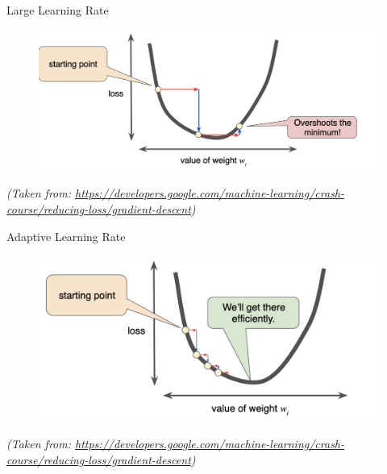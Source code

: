 \begin{frame}{Large Learning Rate}
         \begin{figure}
        \centering
          \includegraphics[scale=0.4]{./figures/large_lr.png}
        \end{figure}
\vspace*{\fill}
\textit{\tiny{(Taken from: 
\url{https://developers.google.com/machine-learning/crash-course/reducing-loss/gradient-descent})}}
\end{frame}
\begin{frame}{Adaptive Learning Rate}
         \begin{figure}
        \centering
        \includegraphics[scale=0.40]{./figures/adaptive_lr.png}
        \end{figure}
\vspace*{\fill}
\textit{\tiny{(Taken from: 
\url{https://developers.google.com/machine-learning/crash-course/reducing-loss/gradient-descent})}}
\end{frame}

